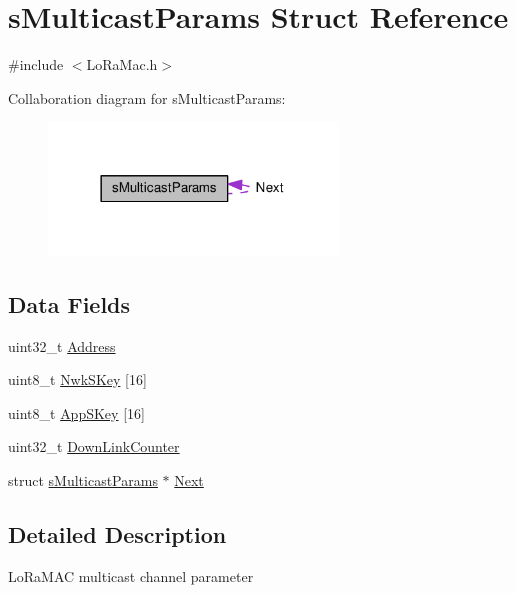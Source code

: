\hypertarget{structsMulticastParams}{}\section{s\+Multicast\+Params Struct Reference}
\label{structsMulticastParams}


{\ttfamily \#include $<$Lo\+Ra\+Mac.\+h$>$}



Collaboration diagram for s\+Multicast\+Params\+:
\nopagebreak
\begin{figure}[H]
\begin{center}
\leavevmode
\includegraphics[width=218pt]{structsMulticastParams__coll__graph}
\end{center}
\end{figure}
\subsection*{Data Fields}
\begin{DoxyCompactItemize}
\item 
uint32\+\_\+t \hyperlink{structsMulticastParams_abe2277479419032f7c79368048a865e8}{Address}
\item 
uint8\+\_\+t \hyperlink{structsMulticastParams_a71330fdf812a469a4727bed311a22353}{Nwk\+S\+Key} \mbox{[}16\mbox{]}
\item 
uint8\+\_\+t \hyperlink{structsMulticastParams_abf0b21eb52ca715692003aa9712f9de5}{App\+S\+Key} \mbox{[}16\mbox{]}
\item 
uint32\+\_\+t \hyperlink{structsMulticastParams_a2c9143b93413848d615a9f0c7f7afc09}{Down\+Link\+Counter}
\item 
struct \hyperlink{structsMulticastParams}{s\+Multicast\+Params} $\ast$ \hyperlink{structsMulticastParams_a085c359608cb7d61aff9824dcf1769db}{Next}
\end{DoxyCompactItemize}


\subsection{Detailed Description}
Lo\+Ra\+M\+AC multicast channel parameter 

